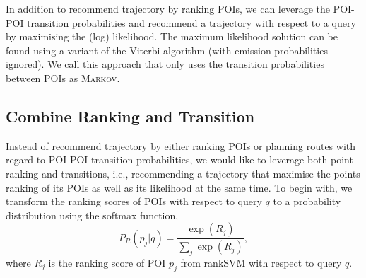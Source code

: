 In addition to recommend trajectory by ranking POIs, we can leverage the POI-POI transition probabilities and 
recommend a trajectory with respect to a query by maximising the (log) likelihood. 
The maximum likelihood solution can be found using a variant of the Viterbi algorithm (with emission probabilities ignored).
We call this approach that only uses the transition probabilities between POIs as \textsc{Markov}.




\subsection{Combine Ranking and Transition}
\label{sec:rank+markov}





Instead of recommend trajectory by either ranking POIs or planning routes with regard to POI-POI transition probabilities, 
we would like to leverage both point ranking and transitions,
i.e., recommending a trajectory that maximise the points ranking of its POIs as well as its likelihood at the same time.
To begin with, we transform the ranking scores of POIs with respect to query $q$
to a probability distribution using the softmax function,
\begin{equation}
\label{eq:rankprob}
P_R(p_j | q) = \frac{\exp(R_j)}{\sum_j \exp(R_j)},
\end{equation}
where $R_j$ is the ranking score of POI $p_j$ from rankSVM with respect to query $q$.

